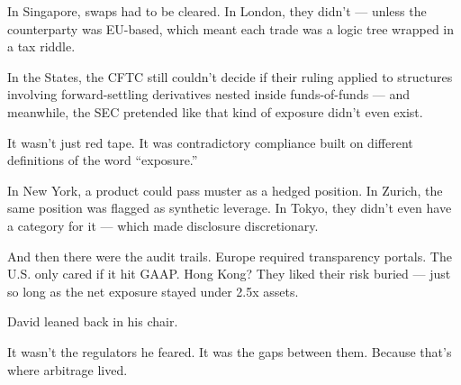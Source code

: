 \begin{tcolorbox}[
    enhanced,
    sharp corners,
    boxrule=0pt,
    colback=gray!3,
    borderline west={2pt}{0pt}{gray!60}, %
    left=10pt,
    right=10pt,
    top=6pt,
    bottom=6pt,
    width=\linewidth,
    fontupper=\small\itshape
  ]
  In Singapore, swaps had to be cleared.  
  In London, they didn’t — unless the counterparty was EU-based, which meant each trade was a logic tree wrapped in a tax riddle.

  \medskip
  
  In the States, the CFTC still couldn’t decide if their ruling applied to structures involving forward-settling derivatives nested inside funds-of-funds —  
  and meanwhile, the SEC pretended like that kind of exposure didn’t even exist.

  \medskip
  
  
  It wasn’t just red tape.  
  It was contradictory compliance built on different definitions of the word “exposure.”

  \medskip
  
  
  In New York, a product could pass muster as a hedged position.  
  In Zurich, the same position was flagged as synthetic leverage.  
  In Tokyo, they didn’t even have a category for it — which made disclosure discretionary.

  \medskip
  
  And then there were the audit trails.  
  Europe required transparency portals.  
  The U.S. only cared if it hit GAAP.  
  Hong Kong? They liked their risk buried — just so long as the net exposure stayed under 2.5x assets.
\end{tcolorbox}
  
\medskip

David leaned back in his chair.

It wasn’t the regulators he feared.
It was the gaps between them.
Because that’s where arbitrage lived.

\medskip

